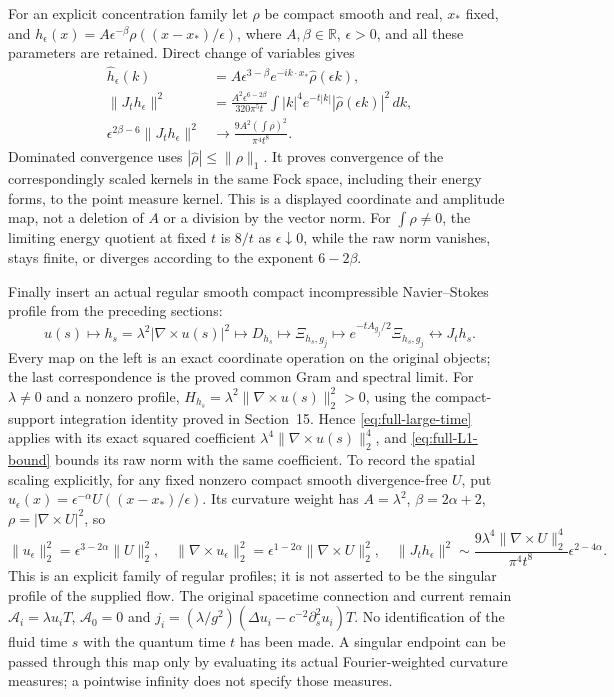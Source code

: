 For an explicit concentration family let $\rho$ be compact smooth
and real, $x_*$ fixed, and
$h_\epsilon(x)=A\epsilon^{-\beta}\rho((x-x_*)/\epsilon)$,
where $A,\beta\in\mathbb R$, $\epsilon>0$, and all these parameters
are retained. Direct change of variables gives
\begin{align}
 \widehat h_\epsilon(k)
   &=A\epsilon^{3-\beta}e^{-ik\cdot x_*}\widehat\rho(\epsilon k),
       \nonumber\\
 \|J_t h_\epsilon\|^2
   &= \frac{A^2\epsilon^{6-2\beta}}{320\pi^5t}
       \int |k|^4e^{-t|k|}|\widehat\rho(\epsilon k)|^2\,dk,
       \label{eq:full-concentration}\\
 \epsilon^{2\beta-6}\|J_t h_\epsilon\|^2
   &\longrightarrow \frac{9A^2(\int\rho)^2}{\pi^4t^8}.
       \nonumber
\end{align}
Dominated convergence uses $|\widehat\rho|\le\|\rho\|_1$.
It proves convergence of the correspondingly scaled kernels in
the same Fock space, including their energy forms, to the point
measure kernel. This is a displayed coordinate and amplitude map,
not a deletion of $A$ or a division by the vector norm. For
$\int\rho\ne0$, the limiting energy quotient at fixed $t$ is
$8/t$ as $\epsilon\downarrow0$, while the raw norm vanishes,
stays finite, or diverges according to the exponent $6-2\beta$.

Finally insert an actual regular smooth compact incompressible
Navier--Stokes profile from the preceding sections:
\begin{equation}\label{eq:full-NS-chain}
 u(s)\longmapsto h_s=\lambda^2|\nabla\times u(s)|^2
 \longmapsto D_{h_s}\longmapsto\Xi_{h_s,g_j}
 \longmapsto e^{-tA_{g_j}/2}\Xi_{h_s,g_j}
 \longleftrightarrow J_t h_s .
\end{equation}
Every map on the left is an exact coordinate operation on the
original objects; the last correspondence is the proved common
Gram and spectral limit. For $\lambda\ne0$ and a nonzero profile,
$H_{h_s}=\lambda^2\|\nabla\times u(s)\|_2^2>0$, using the
compact-support integration identity proved in Section~15. Hence
\eqref{eq:full-large-time} applies with its exact squared
coefficient $\lambda^4\|\nabla\times u(s)\|_2^4$, and
\eqref{eq:full-L1-bound} bounds its raw norm with the same
coefficient. To record the spatial scaling explicitly, for any
fixed nonzero compact smooth divergence-free $U$, put
$u_\epsilon(x)=\epsilon^{-\alpha}U((x-x_*)/\epsilon)$.
Its curvature weight has $A=\lambda^2$,
$\beta=2\alpha+2$, $\rho=|\nabla\times U|^2$, so
\[
 \|u_\epsilon\|_2^2=\epsilon^{3-2\alpha}\|U\|_2^2,
 \quad \|\nabla\times u_\epsilon\|_2^2
          =\epsilon^{1-2\alpha}\|\nabla\times U\|_2^2,
 \quad \|J_t h_\epsilon\|^2
       \sim \frac{9\lambda^4\|\nabla\times U\|_2^4}{\pi^4t^8}
                    \epsilon^{2-4\alpha}.
\]
This is an explicit family of regular profiles; it is not asserted
to be the singular profile of the supplied flow. The original
spacetime connection and current remain
$\mathcal A_i=\lambda u_iT$, $\mathcal A_0=0$ and
$j_i=(\lambda/g^2)(\Delta u_i-c^{-2}\partial_s^2u_i)T$.
No identification of the fluid time $s$ with the quantum time $t$
has been made. A singular endpoint can be passed through this
map only by evaluating its actual Fourier-weighted curvature
measures; a pointwise infinity does not specify those measures.

